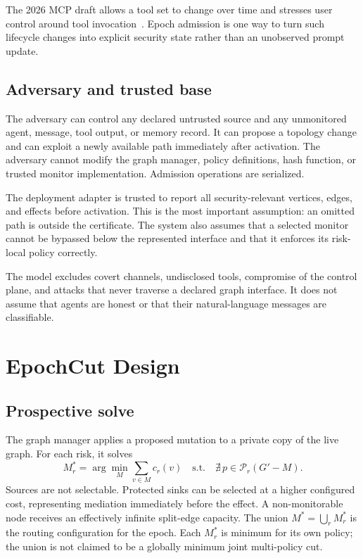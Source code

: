 \documentclass[10pt,journal,compsoc]{IEEEtran}
\newcommand{\paths}{\mathcal{P}}
\begin{document}
The 2026 MCP draft allows a tool set to change over time and stresses user
control around tool invocation~\cite{mcp2026spec}.  Epoch admission is one way
to turn such lifecycle changes into explicit security state rather than an
unobserved prompt update.

\subsection{Adversary and trusted base}

The adversary can control any declared untrusted source and any unmonitored
agent, message, tool output, or memory record.  It can propose a topology change
and can exploit a newly available path immediately after activation.  The
adversary cannot modify the graph manager, policy definitions, hash function,
or trusted monitor implementation.  Admission operations are serialized.

The deployment adapter is trusted to report all security-relevant vertices,
edges, and effects before activation.  This is the most important assumption:
an omitted path is outside the certificate.  The system also assumes that a
selected monitor cannot be bypassed below the represented interface and that
it enforces its risk-local policy correctly.

The model excludes covert channels, undisclosed tools, compromise of the
control plane, and attacks that never traverse a declared graph interface.  It
does not assume that agents are honest or that their natural-language messages
are classifiable.

\section{EpochCut Design}

\subsection{Prospective solve}

The graph manager applies a proposed mutation to a private copy of the live
graph.  For each risk, it solves
\begin{equation}
 M^{*}_{r} = \arg\min_{M}\sum_{v\in M}c_r(v)
 \quad\text{s.t.}\quad
 \nexists\,p\in\paths_r(G'-M).
 \label{eq:mincut}
\end{equation}
Sources are not selectable.  Protected sinks can be selected at a higher
configured cost, representing mediation immediately before the effect.  A
non-monitorable node receives an effectively infinite split-edge capacity.
The union $M^*=\bigcup_r M^*_r$ is the routing configuration for the epoch.
Each $M^*_r$ is minimum for its own policy; the union is not claimed to be a
globally minimum joint multi-policy cut.
\end{document}
